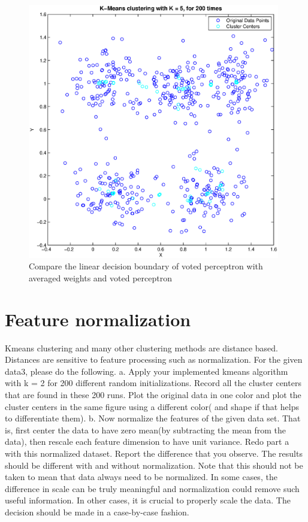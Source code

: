\documentclass{article} %
\begin{document}
\begin{figure}[h]
\begin{center}
\includegraphics[width=11cm]{Fig/fig_Kmeans_with_random_initialization.eps}
 \end{center}
\caption{\small{Compare the linear decision boundary of voted perceptron with averaged weights and voted perceptron}} 
\label{fig:vote_perceptroncompareW1}
\end{figure}

\section{Feature normalization}
Kmeans clustering and many other clustering methods are distance based. Distances are sensitive to feature processing such as normalization. For the given data3, please do the following.
a. Apply your implemented kmeans algorithm with k = 2 for 200 different random initializations. Record all the cluster centers that are found in these 200 runs. Plot the original data in one color and plot the cluster centers in the same figure using a different color( and shape if that helps to differentiate them).
b. Now normalize the features of the given data set. That is, first center the data to have zero mean(by subtracting the mean from the data), then rescale each feature dimension to have unit variance. Redo part a with this normalized dataset. Report the difference that you observe.
The results should be different with and without normalization. Note that this should not be taken to mean that data always need to be normalized. In some cases, the difference in scale can be truly meaningful and normalization could remove such useful information. In other cases, it is crucial to properly scale the data. The decision should be made in a case-by-case fashion.
\end{document}
